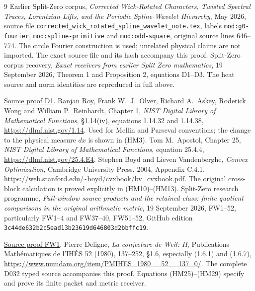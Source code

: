 \documentclass[11pt]{article}
\begin{document}
\begin{thebibliography}{9}
\small
{} Earlier Split-Zero corpus,
\emph{Corrected Wick-Rotated Characters, Twisted Spectral Traces,
Lorentzian Lifts, and the Periodic Spline-Wavelet Hierarchy}, May 2026,
source file
\texttt{corrected\_wick\_rotated\_spline\_wavelet\_note.tex},
labels \texttt{mod:g0-fourier}, \texttt{mod:spline-primitive} and
\texttt{mod:odd-square}, original source lines 646--774.
The circle Fourier construction is used; unrelated physical claims are
not imported. The exact source file and its hash accompany this proof.
 Split-Zero corpus recovery,
\emph{Exact receivers from earlier Split Zero mathematics},
19 September 2026, Theorem 1 and Proposition 2, equations D1--D3.
The heat source and norm identities are reproduced in full above.

\href{https://github.com/KokunoYumeto/zeta-function-research-reader/blob/5992ad50c0f2a06921f1fcaded7b4e38097c0739/workbenches/splitzero-tandem/continuations/20260920-original-kernel-mixed-determinants/providers/EXACT_CORPUS_RECEIVERS.tex\#L55}{Source proof D1}.
 Ranjan Roy, Frank W.~J.~Olver, Richard A.~Askey,
Roderick Wong and William P.~Reinhardt, Chapter 1,
\emph{NIST Digital Library of Mathematical Functions},
\S1.14(iv), equations 1.14.32 and 1.14.38,
\url{https://dlmf.nist.gov/1.14}.
Used for Mellin and Parseval conventions; the change to the physical
measure $dx$ is shown in (HM3).
 Tom M.~Apostol, Chapter 25,
\emph{NIST Digital Library of Mathematical Functions}, equation 25.4.4,
\url{https://dlmf.nist.gov/25.4.E4}.
 Stephen Boyd and Lieven Vandenberghe,
\emph{Convex Optimization}, Cambridge University Press, 2004,
Appendix C.4.1,
\url{https://web.stanford.edu/~boyd/cvxbook/bv_cvxbook.pdf}.
The original cross-block calculation is proved explicitly in (HM10)--(HM13).
 Split-Zero research programme,
\emph{Full-window source products and the retained class: finite quotient
comparisons in the original arithmetic metric}, 19 September 2026,
FW1--52, particularly FW1--4 and FW37--40, FW51--52.
GitHub edition \texttt{3c44de632b2c5ead13b23619d646803d2bbffc19}.

\href{https://github.com/KokunoYumeto/zeta-function-research-reader/blob/5992ad50c0f2a06921f1fcaded7b4e38097c0739/workbenches/splitzero-tandem/continuations/20260920-original-kernel-mixed-determinants/providers/FULL_WINDOW_SOURCE_PRODUCTS.tex\#L28}{Source proof FW1}.
 Pierre Deligne, \emph{La conjecture de Weil: II},
Publications Math\'ematiques de l'IH\'ES 52 (1980), 137--252,
\S1.6, especially (1.6.1) and (1.6.7),
\url{https://www.numdam.org/item/PMIHES_1980__52__137_0/}.
The complete D032 typed source accompanies this proof. Equations
(HM25)--(HM29) specify and prove its finite packet and metric receiver.
\end{thebibliography}
\end{document}
